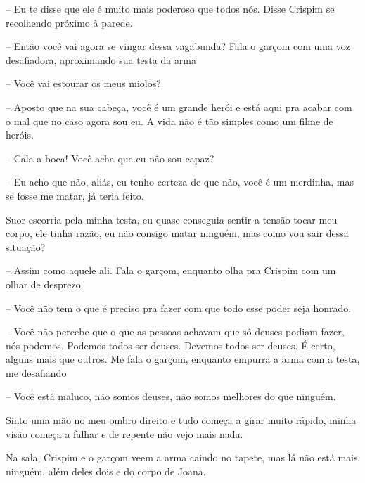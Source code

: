 -- Eu te disse que ele é muito mais poderoso que todos nós. Disse Crispim se recolhendo próximo à parede.

-- Então você vai agora se vingar dessa vagabunda? Fala o garçom com uma voz desafiadora, aproximando sua testa da arma

-- Você vai estourar os meus miolos?

-- Aposto que na sua cabeça, você é um grande herói e está aqui pra acabar com o mal que no caso agora sou eu. A vida não é tão simples como um filme de heróis.

-- Cala a boca! Você acha que eu não sou capaz?

-- Eu acho que não, aliás, eu tenho certeza de que não, você é um merdinha, mas se fosse me matar, já teria feito. 

Suor escorria pela minha testa, eu quase conseguia sentir a tensão tocar meu corpo, ele tinha razão, eu não consigo matar ninguém, mas como vou sair dessa situação?

-- Assim como aquele ali. Fala o garçom, enquanto olha pra Crispim com um olhar de desprezo.

-- Você não tem o que é preciso pra fazer com que todo esse poder seja honrado.

-- Você não percebe que o que as pessoas achavam que só deuses podiam fazer, nós podemos. Podemos todos ser deuses. Devemos todos ser deuses. É certo, alguns mais que outros. Me fala o garçom, enquanto empurra a arma com a testa, me desafiando

-- Você está maluco, não somos deuses, não somos melhores do que ninguém.

Sinto uma mão no meu ombro direito e tudo começa a girar muito rápido, minha visão começa a falhar e de repente não vejo mais nada.

Na sala, Crispim e o garçom veem a arma caindo no tapete, mas lá não está mais ninguém, além deles dois e do corpo de Joana.  

